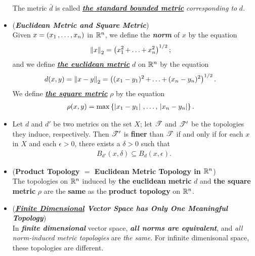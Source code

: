 \documentclass[11pt]{article}
\begin{document}
\begin{itemize}
\begin{remark}
\begin{definition}
The metric $\bar{d}$ is called \underline{\emph{\textbf{the standard bounded metric}}} \emph{corresponding to} $d$.
\end{definition}
\end{remark}

\item \begin{definition} (\emph{\textbf{Euclidean Metric and Square Metric}})\\
Given $x = (x_1 \,{,}\ldots{,}\, x_n)$ in ${\mathbb R}^n$, we define the \emph{\textbf{norm}} of $x$ by the equation
\begin{align*}
\left\|x\right\|_{2} &= \left(x_1^2 \,{+}\ldots{+}\, x_n^2\right)^{1/2};
\end{align*}
and we define \underline{\emph{\textbf{the euclidean metric}}} $d$ on ${\mathbb R}^n$ by the equation
\begin{align*}
d(x, y) = \left\|x - y\right\|_{2} &= \left((x_1 - y_1)^2 \,{+}\ldots{+}\, (x_n - y_n)^2\right)^{1/2}.
\end{align*}
We define \underline{\emph{\textbf{the square metric}}} $\rho$ by the equation
\begin{align*}
\rho(x, y) &= \max\left\{\left\lvert x_1 - y_1 \right\rvert \,{,}\ldots{,}\, \left\lvert x_n - y_n \right\rvert\right\}.
\end{align*}
\end{definition}

\item \begin{lemma}
Let $d$ and $d'$ be two metrics on the set $X$; let ${\mathscr T}$ and ${\mathscr T}'$ be the topologies they induce, respectively. Then ${\mathscr T}'$ is \textbf{finer} than ${\mathscr T}$ if and only if for each $x$ in $X$ and each $\epsilon > 0$, there exists a $\delta > 0$ such that
\begin{align*}
B_{d'}(x, \delta) \subseteq  B_{d}(x, \epsilon).
\end{align*}
\end{lemma}


\item \begin{proposition}(\textbf{Product Topology $=$ Euclidean Metric Topology in ${\mathbb R}^n$})\\
The topologies on ${\mathbb R}^n$ induced by \textbf{the euclidean metric} $d$ and \textbf{the square metric} $\rho$ are the \textbf{same} as the \textbf{product topology} on ${\mathbb R}^n$.
\end{proposition}

\item \begin{remark} (\emph{\textbf{\underline{Finite Dimensional} Vector Space has Only One Meaningful Topology}})\\
In \emph{\textbf{finite dimensional}} vector space, \emph{\textbf{all norms are equivalent}}, and  \emph{all norm-induced metric topologies} are \emph{the same}. For infinite dimenisonal space, these topologies are different.
\end{remark}


\end{itemize}
\end{document}
